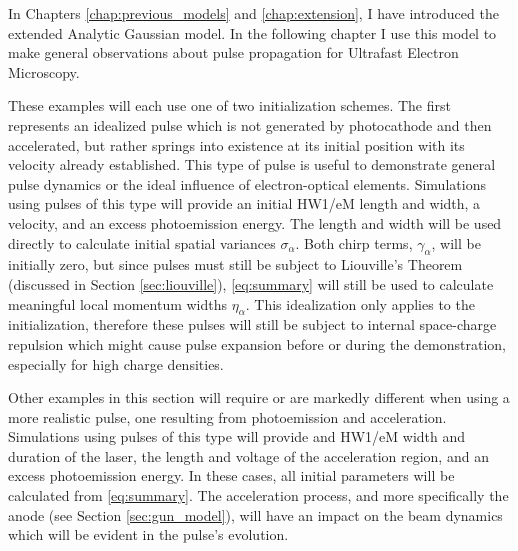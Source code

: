 
In Chapters \ref{chap:previous_models} and \ref{chap:extension}, I have introduced the extended Analytic Gaussian model.
In the following chapter I use this model to make general observations about pulse propagation for Ultrafast Electron Microscopy.

These examples will each use one of two initialization schemes.
The first represents an idealized pulse which is not generated by photocathode and then accelerated, but rather springs into existence at its initial position with its velocity already established.
This type of pulse is useful to demonstrate general pulse dynamics or the ideal influence of electron-optical elements.
Simulations using pulses of this type will provide an initial HW1/eM length and width, a velocity, and an excess photoemission energy.
The length and width will be used directly to calculate initial spatial variances $\sigma_{\alpha}$.
Both chirp terms, $\gamma_{\alpha}$, will be initially zero, but since pulses must still be subject to Liouville's Theorem (discussed in Section \ref{sec:liouville}), \ref{eq:summary} will still be used to calculate meaningful local momentum widths $\eta_{\alpha}$.
This idealization only applies to the initialization, therefore these pulses will still be subject to internal space-charge repulsion which might cause pulse expansion before or during the demonstration, especially for high charge densities.

Other examples in this section will require or are markedly different when using a more realistic pulse, one resulting from photoemission and acceleration.
Simulations using pulses of this type will provide and HW1/eM width and duration of the laser, the length and voltage of the acceleration region, and an excess photoemission energy.
In these cases, all initial parameters will be calculated from \ref{eq:summary}.
The acceleration process, and more specifically the anode (see Section \ref{sec:gun_model}), will have an impact on the beam dynamics which will be evident in the pulse's evolution.

